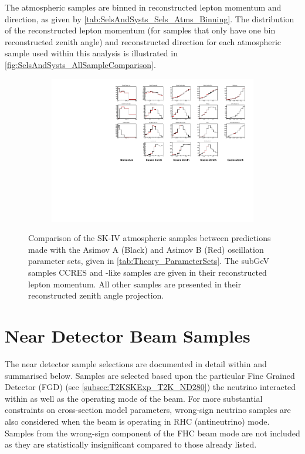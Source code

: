 The atmospheric samples are binned in reconstructed lepton momentum and direction, as given by \autoref{tab:SelsAndSysts_Sels_Atms_Binning}. The distribution of the reconstructed lepton momentum (for samples that only have one bin reconstructed zenith angle) and reconstructed direction for each atmospheric sample used within this analysis is illustrated in \autoref{fig:SelsAndSysts_AllSampleComparison}.

\begin{figure}
  \centering
  \begin{subfigure}[t]{\textwidth}
    \includegraphics[width=\textwidth, trim={0mm 0mm 0mm 0mm}, clip,page=1]{Figures/Selections/HistogramComparison.pdf}
  \end{subfigure}
  \caption{Comparison of the SK-IV atmospheric samples between predictions made with the Asimov A (Black) and Asimov B (Red) oscillation parameter sets, given in \autoref{tab:Theory_ParameterSets}. The subGeV samples CCRES and -like samples are given in their reconstructed lepton momentum. All other samples are presented in their reconstructed zenith angle projection.}
  \label{fig:SelsAndSysts_AllSampleComparison}
\end{figure}

\clearpage
\section{Near Detector Beam Samples}
\label{sec:SelsAndSysts_Sels_ND}

The near detector sample selections are documented in detail within \cite{t2k_tn_395} and summarised below. Samples are selected based upon the particular Fine Grained Detector (FGD) (see \autoref{subsec:T2KSKExp_T2K_ND280}) the neutrino interacted within as well as the operating mode of the beam. For more substantial constraints on cross-section model parameters, wrong-sign neutrino samples are also considered when the beam is operating in RHC (antineutrino) mode. Samples from the wrong-sign component of the FHC beam mode are not included as they are statistically insignificant compared to those already listed.

